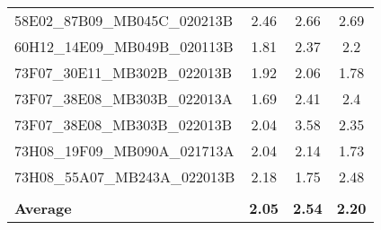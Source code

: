 \begin{adjustbox}{width=\textwidth}
\begin{tabular}{|l|ccc|}
	58E02\_87B09\_MB045C\_020213B                              & \multicolumn{1}{c|}{2.46}               & \multicolumn{1}{c|}{2.66}                                                                    & 2.69                                                                             \\
	60H12\_14E09\_MB049B\_020113B                              & \multicolumn{1}{c|}{1.81}               & \multicolumn{1}{c|}{2.37}                                                                    & 2.2                                                                              \\
	73F07\_30E11\_MB302B\_022013B                              & \multicolumn{1}{c|}{1.92}               & \multicolumn{1}{c|}{2.06}                                                                    & 1.78                                                                             \\
	73F07\_38E08\_MB303B\_022013A                              & \multicolumn{1}{c|}{1.69}               & \multicolumn{1}{c|}{2.41}                                                                    & 2.4                                                                              \\
	73F07\_38E08\_MB303B\_022013B                              & \multicolumn{1}{c|}{2.04}               & \multicolumn{1}{c|}{3.58}                                                                    & 2.35                                                                             \\
	73H08\_19F09\_MB090A\_021713A                              & \multicolumn{1}{c|}{2.04}               & \multicolumn{1}{c|}{2.14}                                                                    & 1.73                                                                             \\
	73H08\_55A07\_MB243A\_022013B                              & \multicolumn{1}{c|}{2.18}               & \multicolumn{1}{c|}{1.75}                                                                    & 2.48                                                                             \\
	& \multicolumn{1}{l|}{}                   & \multicolumn{1}{l|}{}                                                                        & \multicolumn{1}{l|}{}                                                            \\ \hline
	\textbf{Average}                                           & \multicolumn{1}{c|}{\textbf{2.05}}      & \multicolumn{1}{c|}{\textbf{2.54}}                                                           & \textbf{2.20}                                                                    \\ \hline
\end{tabular}
\end{adjustbox}